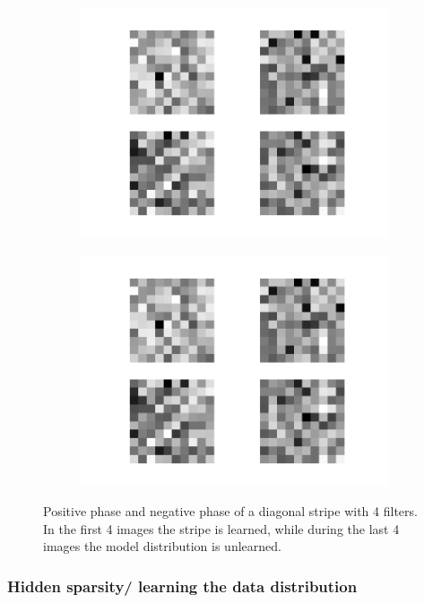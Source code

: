 \begin{figure}[h!]
\begin{subfigure}[t]{.19\textwidth}
  		\includegraphics[width=\linewidth]{imgs/inspect/00017.png}
  		\label{fig:sub1}
	\end{subfigure}%
	\begin{subfigure}[t]{.19\textwidth}
  		\centering
  		\includegraphics[width=\linewidth]{imgs/inspect/00018.png}
  		\label{fig:sub1}
	\end{subfigure}%
	\caption{Positive phase and negative phase of a diagonal stripe with 4 filters. In the first 4 images the stripe is learned, while during the last 4 images the model distribution is unlearned.}
	\label{fig:stripes}
\end{figure}


\subsubsection{Hidden sparsity/ learning the data distribution}

